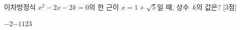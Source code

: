 이차방정식 $x^2-2x-2k=0$의 한 근이 $x=1+\sqrt{5}$일 때, 상수~$k$의 값은? \mbox{[3점]}
\begin{choices32}{$-2$}{$-1$}{$1$}{$2$}{$3$}\end{choices32}
